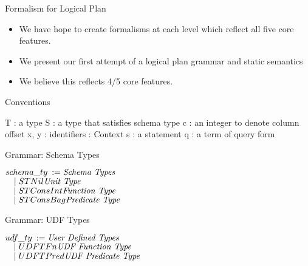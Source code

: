 \begin{frame}{Formalism for Logical Plan}
\begin{itemize}
	\item We have hope to create formalisms at each level which reflect all five
	core features.
	\item We present our first attempt of a logical plan grammar and static
	semantics
	\item We believe this reflects 4/5 core features.
\end{itemize}
\end{frame}

\begin{frame}{Conventions}
\centering
	\begin{flushleft}
		T : a type\newline
		S : a type that satisfies schema type\newline
		c : an integer to denote column offset\newline
		x, y : identifiers\newline
		\textGamma \: : Context\newline
 		s : a statement\newline
 		q : a term of query form\newline 
	\end{flushleft}
\end{frame}


\begin{frame}{Grammar: Schema Types}
\centering
	\begin{flushleft}
	$ schema\_ty \::= \hfill \textnormal{\emph{Schema Types}}\hfill$\\
	$ \quad \mid STNil\hfill \textnormal{\emph{Unit Type}}\hfill$\\
   	$ \quad \mid STConsInt \hfill \textnormal{\emph{Function Type}}\hfill$\\
     	$ \quad \mid STConsBag \hfill \textnormal{\emph{Predicate Type}}\hfill$\\
	\end{flushleft}
\end{frame}

\begin{frame}{Grammar: UDF Types}
\centering
	\begin{flushleft}
	$ udf\_ty \::= \hfill \textnormal{\emph{User Defined Types}}\hfill$\\
	$ \quad \mid UDFTFn\hfill \textnormal{\emph{UDF Function Type}}\hfill$\\
   	$ \quad \mid UDFTPred \hfill \textnormal{\emph{UDF Predicate Type}}\hfill$\\
	\end{flushleft}
\end{frame}

